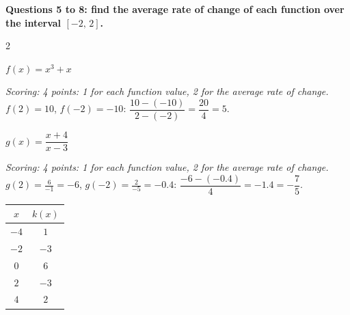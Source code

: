 \begin{center}\textsf{\small\bfseries\color{apnavy}Questions 5 to 8: find the average rate of change of each function over the interval $[-2,\,2]$.}\end{center}
\begin{multicols}{2}\raggedcolumns
\noindent\begin{minipage}{\linewidth}
\begin{exo}{}
$f(x)=x^3+x$
\ifkey\else\vspace{1.6cm}\fi
\begin{solution}
\textit{Scoring: 4 points: 1 for each function value, 2 for the average rate of change.}\\
$f(2)=10$, $f(-2)=-10$: $\dfrac{10-(-10)}{2-(-2)}=\dfrac{20}{4}=5$.
\end{solution}
\end{exo}
\end{minipage}\par\vspace{8pt}
\noindent\begin{minipage}{\linewidth}
\begin{exo}{}
$g(x)=\dfrac{x+4}{x-3}$
\ifkey\else\vspace{1.6cm}\fi
\begin{solution}
\textit{Scoring: 4 points: 1 for each function value, 2 for the average rate of change.}\\
$g(2)=\frac{6}{-1}=-6$, $g(-2)=\frac{2}{-5}=-0.4$: $\dfrac{-6-(-0.4)}{4}=-1.4=-\dfrac75$.
\end{solution}
\end{exo}
\end{minipage}\par\vspace{8pt}
\noindent\begin{minipage}{\linewidth}
\begin{exo}{}
\begin{center}\begin{tabular}{|c|c|}\hline$x$&$k(x)$\\\hline$-4$&$1$\\\hline$-2$&$-3$\\\hline$0$&$6$\\\hline$2$&$-3$\\\hline$4$&$2$\\\hline\end{tabular}\end{center}
\ifkey\else\vspace{0.6cm}\fi

\end{exo}
\end{minipage}
\end{multicols}
